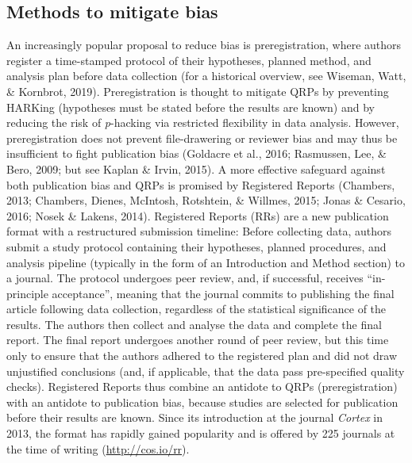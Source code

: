 \documentclass[british,,jou,floatsintext]{apa6}
\begin{document}
\hypertarget{methods-to-mitigate-bias}{%
\subsection{Methods to mitigate bias}\label{methods-to-mitigate-bias}}

An increasingly popular proposal to reduce bias is preregistration, where authors register a time-stamped protocol of their hypotheses, planned method, and analysis plan before data collection (for a historical overview, see Wiseman, Watt, \& Kornbrot, 2019).
Preregistration is thought to mitigate QRPs by preventing HARKing (hypotheses must be stated before the results are known) and by reducing the risk of \emph{p}-hacking via restricted flexibility in data analysis.
However, preregistration does not prevent file-drawering or reviewer bias and may thus be insufficient to fight publication bias (Goldacre et al., 2016; Rasmussen, Lee, \& Bero, 2009; but see Kaplan \& Irvin, 2015).
A more effective safeguard against both publication bias and QRPs is promised by Registered Reports (Chambers, 2013; Chambers, Dienes, McIntosh, Rotshtein, \& Willmes, 2015; Jonas \& Cesario, 2016; Nosek \& Lakens, 2014).
Registered Reports (RRs) are a new publication format with a restructured submission timeline:
Before collecting data, authors submit a study protocol containing their hypotheses, planned procedures, and analysis pipeline (typically in the form of an Introduction and Method section) to a journal.
The protocol undergoes peer review, and, if successful, receives \enquote{in-principle acceptance}, meaning that the journal commits to publishing the final article following data collection, regardless of the statistical significance of the results.
The authors then collect and analyse the data and complete the final report.
The final report undergoes another round of peer review, but this time only to ensure that the authors adhered to the registered plan and did not draw unjustified conclusions (and, if applicable, that the data pass pre-specified quality checks).
Registered Reports thus combine an antidote to QRPs (preregistration) with an antidote to publication bias, because studies are selected for publication before their results are known.
Since its introduction at the journal \emph{Cortex} in 2013, the format has rapidly gained popularity and is offered by 225 journals at the time of writing (\url{http://cos.io/rr}).
\end{document}
